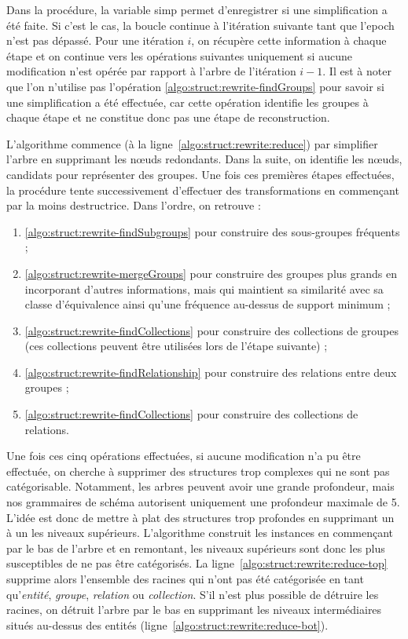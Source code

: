 Dans la procédure, la variable \textsf{simp} permet d'enregistrer si une simplification a été faite.
Si c'est le cas, la boucle continue à l'itération suivante tant que l'epoch n'est pas dépassé.
Pour une itération $i$, on récupère cette information à chaque étape et on continue vers les opérations suivantes uniquement si aucune modification n'est opérée par rapport à l'arbre de l'itération $i - 1$.
Il est à noter que l'on n'utilise pas l'opération \ref{algo:struct:rewrite-findGroups} pour savoir si une simplification a été effectuée, car cette opération identifie les groupes à chaque étape et ne constitue donc pas une étape de reconstruction.

L'algorithme commence (à la ligne~\ref{algo:struct:rewrite:reduce}) par simplifier l'arbre en supprimant les nœuds redondants.
Dans la suite, on identifie les nœuds, candidats pour représenter des groupes.
Une fois ces premières étapes effectuées, la procédure tente successivement d'effectuer des transformations en commençant par la moins destructrice.
Dans l'ordre, on retrouve :
\begin{enumerate}
    \item \ref{algo:struct:rewrite-findSubgroups} pour construire des sous-groupes fréquents ;
    \item \ref{algo:struct:rewrite-mergeGroups} pour construire des groupes plus grands en incorporant d'autres informations, mais qui maintient sa similarité avec sa classe d'équivalence ainsi qu'une fréquence au-dessus de support minimum ;
    \item \ref{algo:struct:rewrite-findCollections} pour construire des collections de groupes (ces collections peuvent être utilisées lors de l'étape suivante) ;
    \item \ref{algo:struct:rewrite-findRelationship} pour construire des relations entre deux groupes ;
    \item \ref{algo:struct:rewrite-findCollections} pour construire des collections de relations.
\end{enumerate}

Une fois ces cinq opérations effectuées, si aucune modification n'a pu être effectuée, on cherche à supprimer des structures trop complexes qui ne sont pas catégorisable.
Notamment, les arbres peuvent avoir une grande profondeur, mais nos grammaires de schéma autorisent uniquement une profondeur maximale de 5.
L'idée est donc de mettre à plat des structures trop profondes en supprimant un à un les niveaux supérieurs.
L'algorithme construit les instances en commençant par le bas de l'arbre et en remontant, les niveaux supérieurs sont donc les plus susceptibles de ne pas être catégorisés.
La ligne~\ref{algo:struct:rewrite:reduce-top} supprime alors l'ensemble des racines qui n'ont pas été catégorisée en tant qu'\emph{entité}, \emph{groupe}, \emph{relation} ou \emph{collection}.
S'il n'est plus possible de détruire les racines, on détruit l'arbre par le bas en supprimant les niveaux intermédiaires situés au-dessus des entités (ligne~\ref{algo:struct:rewrite:reduce-bot}).


